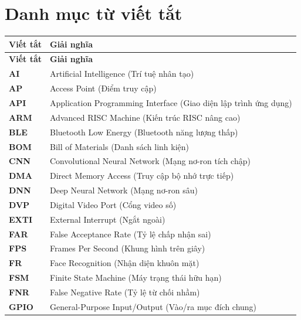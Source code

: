 \chapter*{Danh mục từ viết tắt}

\small
\setlength{\tabcolsep}{5pt}
\renewcommand{\arraystretch}{1.05}
\begin{longtable}{>{\bfseries}p{2.5cm} p{}}
  \toprule
  \textbf{Viết tắt} & \textbf{Giải nghĩa} \\
  \midrule
  \endfirsthead
  \toprule
  \textbf{Viết tắt} & \textbf{Giải nghĩa} \\
  \midrule
  \endhead
  \bottomrule
  \endfoot
  AI      & Artificial Intelligence (Trí tuệ nhân tạo) \\
  AP      & Access Point (Điểm truy cập) \\
  API     & Application Programming Interface (Giao diện lập trình ứng dụng) \\
  ARM     & Advanced RISC Machine (Kiến trúc RISC nâng cao) \\
  BLE     & Bluetooth Low Energy (Bluetooth năng lượng thấp) \\
  BOM     & Bill of Materials (Danh sách linh kiện) \\
  CNN     & Convolutional Neural Network (Mạng nơ-ron tích chập) \\
  DMA     & Direct Memory Access (Truy cập bộ nhớ trực tiếp) \\
  DNN     & Deep Neural Network (Mạng nơ-ron sâu) \\
  DVP     & Digital Video Port (Cổng video số) \\
  EXTI    & External Interrupt (Ngắt ngoài) \\
  FAR     & False Acceptance Rate (Tỷ lệ chấp nhận sai) \\
  FPS     & Frames Per Second (Khung hình trên giây) \\
  FR      & Face Recognition (Nhận diện khuôn mặt) \\
  FSM     & Finite State Machine (Máy trạng thái hữu hạn) \\
  FNR     & False Negative Rate (Tỷ lệ từ chối nhầm) \\
  GPIO    & General-Purpose Input/Output (Vào/ra mục đích chung) \\

\end{longtable}
